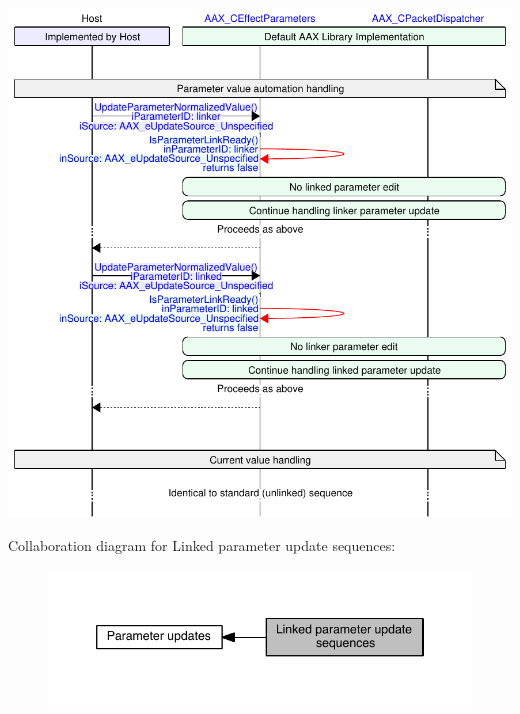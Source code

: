 \begin{DoxyImage}
\includegraphics[width=\textwidth,height=\textheight/2,keepaspectratio=true]{msc_AAX_LinkedParameterUpdate_Automation}
\caption{Sequence of method calls and events during automation playback with linked parameters}
\end{DoxyImage}
Collaboration diagram for Linked parameter update sequences\+:
\nopagebreak
\begin{figure}[H]
\begin{center}
\leavevmode
\includegraphics[width=346pt]{a00355}
\end{center}
\end{figure}
